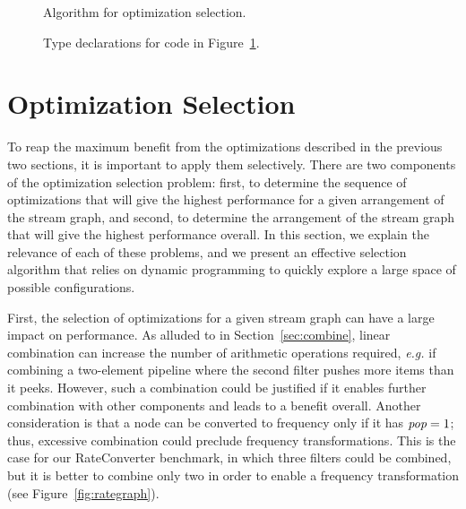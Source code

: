 \begin{figure}[t]
  \caption{Algorithm for optimization selection.
  \protect\label{fig:part-alg}}
\end{figure}

\begin{figure}[t]
  \caption{Type declarations for code in Figure~\ref{fig:part-alg}.}
\end{figure}


\section{Optimization Selection}

To reap the maximum benefit from the optimizations described in the
previous two sections, it is important to apply them selectively.
There are two components of the optimization selection problem: first,
to determine the sequence of optimizations that will give the highest
performance for a given arrangement of the stream graph, and second,
to determine the arrangement of the stream graph that will give the
highest performance overall.  In this section, we explain the
relevance of each of these problems, and we present an effective
selection algorithm that relies on dynamic programming to quickly
explore a large space of possible configurations.

First, the selection of optimizations for a given stream graph can
have a large impact on performance.  As alluded to in
Section~\ref{sec:combine}, linear combination can increase the number
of arithmetic operations required, {\it e.g.} if combining a
two-element pipeline where the second filter pushes more items than it
peeks.  However, such a combination could be justified if it enables
further combination with other components and leads to a benefit
overall.  Another consideration is that a node can be converted to
frequency only if it has $\mbox{\it pop}=1$; thus, excessive combination
could preclude frequency transformations.  This is the case for our
RateConverter benchmark, in which three filters could be combined, but
it is better to combine only two in order to enable a frequency
transformation (see Figure~\ref{fig:rategraph}).

